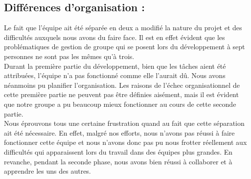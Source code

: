 \documentclass[a4paper,12pt]{article}
\begin{document}
\subsection{Différences d'organisation :}
Le fait que l'équipe ait été séparée en deux a modifié la nature du projet et
des difficultés auxquels nous avons du faire face. Il est en effet évident que
les problématiques de gestion de groupe qui se posent lors du développement à
sept personnes ne sont pas les mêmes qu'à trois.
\\
Durant la première partie du développement, bien que les tâches aient été
attribuées, l'équipe n'a pas fonctionné comme elle l'aurait dû. Nous avons
néanmoins pu planifier l'organisation. Les raisons de l'échec organisationnel de
cette première partie ne peuvent pas être définies aisément, mais il est
évident que notre groupe a pu beaucoup mieux fonctionner au cours de cette
seconde partie.
\\
Nous éprouvons tous une certaine frustration quand au fait que cette séparation
ait été nécessaire. En effet, malgré nos efforts, nous n'avons pas réussi à
faire fonctionner cette équipe et nous n'avons donc pas pu nous frotter
réellement aux difficultés qui apparaissent lors du travail dans des équipes
plus grandes. En revanche, pendant la seconde phase, nous avons bien réussi à
collaborer et à apprendre les uns des autres.
\end{document}
